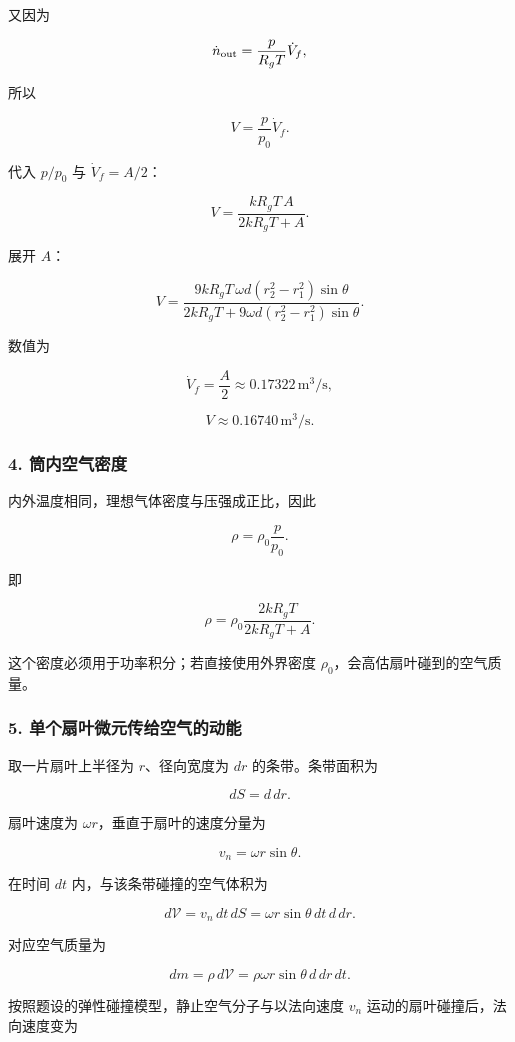 \documentclass[12pt,a4paper,UTF8]{ctexart}
\begin{document}
又因为

\[
\dot n_{\rm out}=\frac{p}{R_gT}\dot V_f,
\]

所以

\[
V=\frac{p}{p_0}\dot V_f.
\]

代入 \(p/p_0\) 与 \(\dot V_f=A/2\)：

\[
\boxed{
V=\frac{kR_gT\,A}{2kR_gT+A}
}.
\]

展开 \(A\)：

\[
\boxed{
V=
\frac{9kR_gT\,\omega d(r_2^2-r_1^2)\sin\theta}
{2kR_gT+9\omega d(r_2^2-r_1^2)\sin\theta}
}.
\]

数值为

\[
\dot V_f=\frac{A}{2}\approx0.17322\,\mathrm{m^3/s},
\]

\[
\boxed{V\approx0.16740\,\mathrm{m^3/s}}.
\]

\subsubsection{4.
筒内空气密度}\label{ux7b52ux5185ux7a7aux6c14ux5bc6ux5ea6}

内外温度相同，理想气体密度与压强成正比，因此

\[
\rho=\rho_0\frac{p}{p_0}.
\]

即

\[
\rho=\rho_0\frac{2kR_gT}{2kR_gT+A}.
\]

这个密度必须用于功率积分；若直接使用外界密度
\(\rho_0\)，会高估扇叶碰到的空气质量。

\subsubsection{5.
单个扇叶微元传给空气的动能}\label{ux5355ux4e2aux6247ux53f6ux5faeux5143ux4f20ux7ed9ux7a7aux6c14ux7684ux52a8ux80fd}

取一片扇叶上半径为 \(r\)、径向宽度为 \(dr\) 的条带。条带面积为

\[
dS=d\,dr.
\]

扇叶速度为 \(\omega r\)，垂直于扇叶的速度分量为

\[
v_n=\omega r\sin\theta.
\]

在时间 \(dt\) 内，与该条带碰撞的空气体积为

\[
d\mathcal V=v_n\,dt\,dS
=\omega r\sin\theta\,dt\,d\,dr.
\]

对应空气质量为

\[
dm=\rho\,d\mathcal V
=\rho\omega r\sin\theta\,d\,dr\,dt.
\]

按照题设的弹性碰撞模型，静止空气分子与以法向速度 \(v_n\)
运动的扇叶碰撞后，法向速度变为
\end{document}
